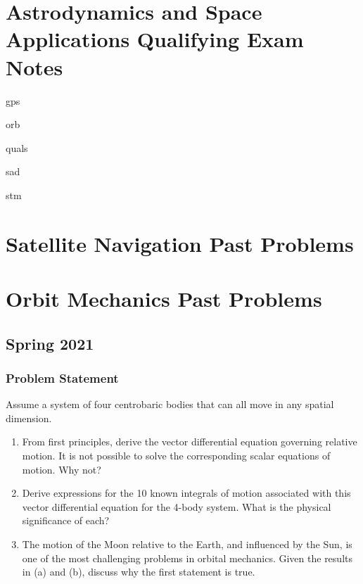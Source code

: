 \documentclass[
]{article}
\author{}
\date{}
\let\oldsection\section
\renewcommand\section{\clearpage\oldsection}
\providecommand{\tightlist}{%
  \setlength{\itemsep}{0pt}\setlength{\parskip}{0pt}}
\begin{document}
\section{Astrodynamics and Space Applications Qualifying Exam
Notes}\label{astrodynamics-and-space-applications-qualifying-exam-notes}

gps

orb

quals

sad

stm

\section{Satellite Navigation Past
Problems}\label{satellite-navigation-past-problems}

\section{Orbit Mechanics Past
Problems}\label{orbit-mechanics-past-problems}

\subsection{Spring 2021}\label{spring-2021}

\subsubsection{Problem Statement}\label{problem-statement}

Assume a system of four centrobaric bodies that can all move in any
spatial dimension.

\begin{enumerate}
\tightlist
\item
  From first principles, derive the vector differential equation
  governing relative motion. It is not possible to solve the
  corresponding scalar equations of motion. Why not?
\item
  Derive expressions for the 10 known integrals of motion associated
  with this vector differential equation for the 4-body system. What is
  the physical significance of each?
\item
  The motion of the Moon relative to the Earth, and influenced by the
  Sun, is one of the most challenging problems in orbital mechanics.
  Given the results in (a) and (b), discuss why the first statement is
  true.
\end{enumerate}
\end{document}
